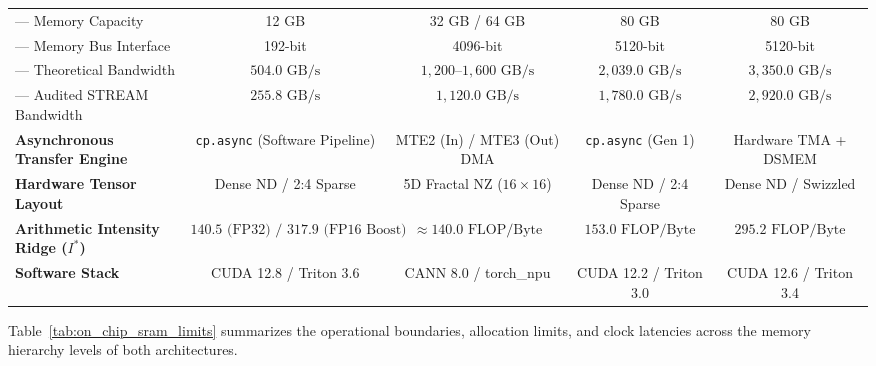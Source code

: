 \begin{table}[t]
{\begin{tabular}{lcccc}
--- Memory Capacity & 12 GB & 32 GB / 64 GB & 80 GB & 80 GB \\
--- Memory Bus Interface & 192-bit & 4096-bit & 5120-bit & 5120-bit \\
--- Theoretical Bandwidth & $504.0\text{ GB/s}$ & $1,200\text{--}1,600\text{ GB/s}$ & $2,039.0\text{ GB/s}$ & $3,350.0\text{ GB/s}$ \\
--- Audited STREAM Bandwidth & $255.8\text{ GB/s}$ & $1,120.0\text{ GB/s}$ & $1,780.0\text{ GB/s}$ & $2,920.0\text{ GB/s}$ \\
\midrule
\textbf{Asynchronous Transfer Engine} & \texttt{cp.async} (Software Pipeline) & MTE2 (In) / MTE3 (Out) DMA & \texttt{cp.async} (Gen 1) & Hardware TMA + DSMEM \\
\textbf{Hardware Tensor Layout} & Dense ND / 2:4 Sparse & 5D Fractal NZ ($16 \times 16$) & Dense ND / 2:4 Sparse & Dense ND / Swizzled \\
\textbf{Arithmetic Intensity Ridge ($I^*$)} & $140.5\text{ (FP32) / }317.9\text{ (FP16 Boost)}$ & $\approx 140.0\text{ FLOP/Byte}$ & $153.0\text{ FLOP/Byte}$ & $295.2\text{ FLOP/Byte}$ \\
\textbf{Software Stack} & CUDA 12.8 / Triton 3.6 & CANN 8.0 / torch\_npu & CUDA 12.2 / Triton 3.0 & CUDA 12.6 / Triton 3.4 \\
\bottomrule
\end{tabular}%
}
\end{table}

Table~\ref{tab:on_chip_sram_limits} summarizes the operational boundaries, allocation limits, and clock latencies across the memory hierarchy levels of both architectures.

